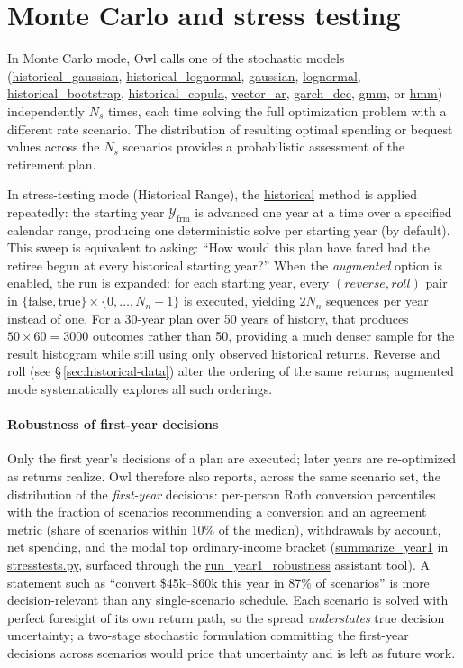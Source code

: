 \documentclass[fleqn,12pt]{report}
\newcommand{\code}[1]{\url{#1}}
\begin{document}
\section{Monte Carlo and stress testing}

In Monte Carlo mode, Owl calls one of the stochastic models
(\code{historical_gaussian}, \code{historical_lognormal}, \code{gaussian},
\code{lognormal}, \code{historical_bootstrap}, \code{historical_copula},
\code{vector_ar}, \code{garch_dcc}, \code{gmm}, or \code{hmm}) independently
$N_s$ times, each time solving the full optimization problem with a different
rate scenario.
The distribution of resulting optimal spending or bequest values across the
$N_s$ scenarios provides a probabilistic assessment of the retirement plan.

In stress-testing mode (Historical Range), the \code{historical} method
is applied repeatedly: the starting year $\mathcal{Y}_{\mathrm{frm}}$ is
advanced one year at a time over a specified calendar range, producing one
deterministic solve per starting year (by default).
This sweep is equivalent to asking: ``How would this plan have fared had the
retiree begun at every historical starting year?''
When the {\em augmented} option is enabled, the run is expanded: for each
starting year, every $(reverse, roll)$ pair in
$\{\mathrm{false}, \mathrm{true}\} \times \{0, \ldots, N_n-1\}$ is executed,
yielding $2 N_n$ sequences per year instead of one.
For a 30-year plan over 50 years of history, that produces $50 \times 60 =
3000$ outcomes rather than 50, providing a much denser sample for the
result histogram while still using only observed historical returns.
Reverse and roll (see \S\,\ref{sec:historical-data}) alter the ordering of
the same returns; augmented mode systematically explores all such orderings.

\paragraph*{Robustness of first-year decisions}
Only the first year's decisions of a plan are executed; later years are
re-optimized as returns realize.
Owl therefore also reports, across the same scenario set, the distribution of
the \emph{first-year} decisions: per-person Roth conversion percentiles with
the fraction of scenarios recommending a conversion and an agreement metric
(share of scenarios within 10\% of the median), withdrawals by account, net
spending, and the modal top ordinary-income bracket
(\code{summarize_year1} in \code{stresstests.py}, surfaced through the
\code{run_year1_robustness} assistant tool).
A statement such as ``convert \$45k--\$60k this year in 87\% of scenarios''
is more decision-relevant than any single-scenario schedule.
Each scenario is solved with perfect foresight of its own return path, so the
spread \emph{understates} true decision uncertainty; a two-stage stochastic
formulation committing the first-year decisions across scenarios would price
that uncertainty and is left as future work.
\end{document}
